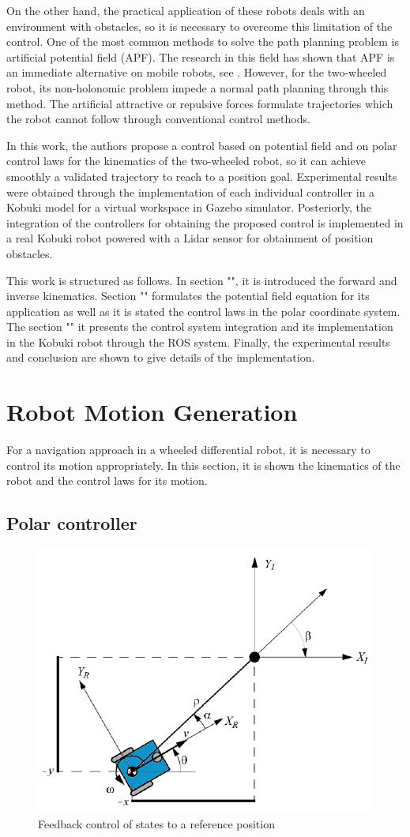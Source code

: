 \documentclass[conference]{IEEEtran}
\begin{document}
On the other hand, the practical application of these robots deals with an environment with obstacles, so it is necessary to overcome this limitation of the control.  One of the most common methods to solve the path planning problem is artificial potential field (APF). The research in this field has shown that APF is an immediate alternative on mobile robots, see \cite{Woods}\cite{Merheb}. However, for the two-wheeled robot, its non-holonomic problem impede a normal path planning through this method. The artificial attractive or repulsive forces formulate trajectories which the robot cannot follow through conventional control methods. 

In this work, the authors propose a control based on potential field and on polar control laws for the kinematics of the two-wheeled robot, so it can achieve smoothly a validated trajectory to reach to a position goal. Experimental results were obtained through the implementation of each individual controller in a Kobuki model for a virtual workspace in Gazebo simulator. Posteriorly, the integration of the controllers for obtaining the proposed control is implemented in a real Kobuki robot powered with a Lidar sensor for obtainment of position obstacles. 
 
This work is structured as follows. In section "", it is introduced the forward and inverse kinematics. Section "" formulates the potential field equation for its application as well as it is stated the control laws in the polar coordinate system. The section "" it presents the control system integration and its implementation in the Kobuki robot through the ROS system. Finally, the experimental results and conclusion are shown to give details of the implementation.

\section{Robot Motion Generation}
\label{sec:robot_motion}
For a navigation approach in a wheeled differential robot, it is necessary to control its motion appropriately. In this section, it is shown the kinematics of the robot and the control laws for its motion.

\subsection{Polar controller}

\begin{figure}[h]
  \includegraphics[width=0.5\linewidth]{control_polar.png}
  \centering\caption{Feedback control of states to a reference position}
  \label{fig:Polar}
\end{figure}
\end{document}
